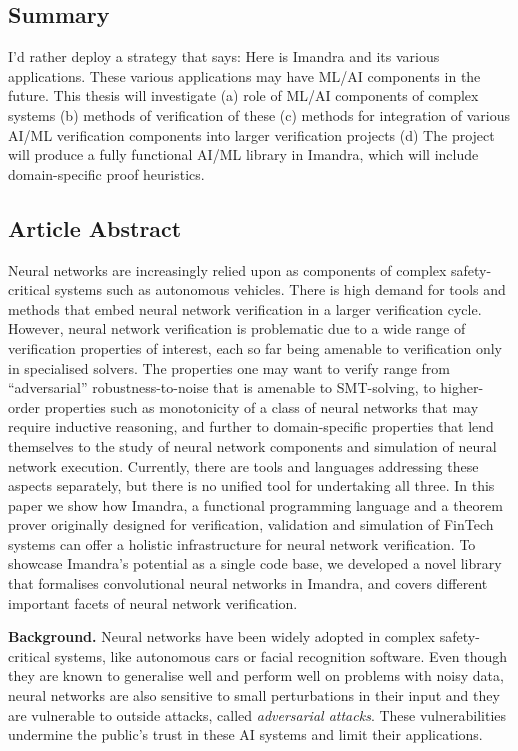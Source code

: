 \documentclass[]{article}
\begin{document}
\subsection*{Summary}
I'd rather deploy a strategy that says: Here is Imandra and its various applications. These various applications may have ML/AI components in the future. This thesis will investigate (a) role of ML/AI components of complex systems (b) methods of verification of these (c) methods for integration of various AI/ML verification components into larger verification projects (d) The project will produce a fully functional AI/ML library in Imandra, which will include domain-specific proof heuristics.

\subsection*{Article Abstract} 

Neural networks are increasingly relied upon as components of complex
safety-critical systems such as autonomous vehicles. There is high demand for
tools and methods that embed neural network verification in a larger
verification cycle. However, neural network verification is problematic
due to a wide range of verification properties of interest,
each so far being amenable to verification only in specialised solvers.
The
properties one may want to verify range from ``adversarial'' robustness-to-noise
that is amenable to SMT-solving, to higher-order properties such as monotonicity
of a class of neural networks that may require inductive reasoning, and further
to domain-specific properties that lend themselves to the study of neural
network components and simulation of neural network execution.
Currently, there
are tools and languages addressing these aspects separately, but there is no
unified tool for undertaking all three.
In this paper we show how Imandra, a
functional programming language and a theorem prover originally designed for
verification, validation and simulation of FinTech systems can offer a holistic
infrastructure for neural network verification. To showcase Imandra's potential as a single code base,
we developed a novel library that
formalises convolutional neural networks in Imandra, and  covers different
important facets of neural network verification.



\textbf{Background.} Neural networks have been widely adopted in complex safety-critical systems, like autonomous cars or facial recognition software. Even though they are known to generalise well and perform well on problems with noisy data, neural networks are also sensitive to small perturbations in their input and they are vulnerable to outside attacks, called \emph{adversarial attacks}. These vulnerabilities undermine the public's trust in these AI systems and limit their applications.
\end{document}
